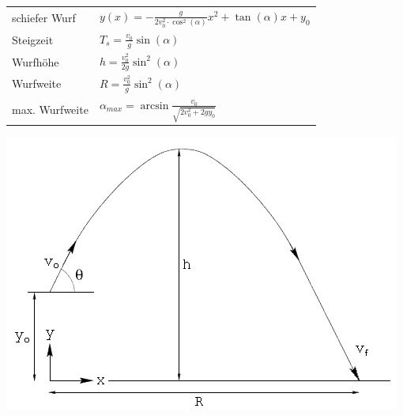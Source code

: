 \documentclass[12pt,a4paper]{article}
\renewcommand{\=}[1]{\stackrel{#1}{=}}
\theoremstyle{definition}
\theoremstyle{remark}
\begin{document}
\begin{center}
\begin{minipage}[t]{.6\linewidth}
\vspace{0pt}
\begin{tabular}{ll}
schiefer Wurf & $y(x) = - \frac{g}{2 v_0^2 \cdot \cos^2(\alpha)} x^2 + \tan(\alpha) x + y_0$\\
Steigzeit & $T_s = \frac{v_0}{g} \sin(\alpha)$\\
Wurfhöhe & $h = \frac{v_0^2}{2g} \sin^2(\alpha)$\\
Wurfweite & $R = \frac{v_0^2}{g} \sin^2(\alpha)$\\
max. Wurfweite & $\alpha_{max} = \arcsin \frac{v_0}{\sqrt{2 v_0^2 + 2 g y_0}}$\\

\end{tabular}
\end{minipage}%
\begin{minipage}[t]{.4\linewidth}
\vspace{0pt}
\centering
\includegraphics[width=\linewidth]{pic/schieferwurf.png}
\end{minipage}
\end{center}
\end{document}
